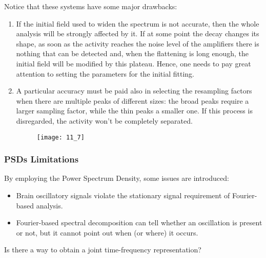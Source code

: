 Notice that these systems have some major drawbacks:
\begin{enumerate}
    \item If the initial field used to widen the spectrum is not accurate, then the whole analysis will be
          strongly affected by it. If at some point the decay changes its shape, as soon as the activity
          reaches the noise level of the amplifiers there is nothing that can be detected and, when the
          flattening is long enough, the initial field will be modified by this plateau. Hence, one needs to
          pay great attention to setting the parameters for the initial fitting.
    \item A particular accuracy must be paid also in selecting the resampling factors when there are multiple
          peaks of different sizes: the broad peaks require a larger sampling factor, while the thin peaks a
          smaller one. If this process is disregarded, the activity won't be completely separated.
          \begin{figure}[H]
              \texttt{[image: 11\_7]}
              \centering
          \end{figure}
\end{enumerate}
\subsubsection{PSDs Limitations}
By employing the Power Spectrum Density, some issues are introduced:
\begin{itemize}
    \item Brain oscillatory signals violate the stationary signal requirement of Fourier-based analysis.
    \item Fourier-based spectral decomposition can tell whether an oscillation is present or not, but
          it cannot point out when (or where) it occurs.
\end{itemize}
Is there a way to obtain a joint time-frequency representation?

